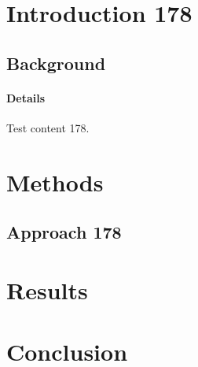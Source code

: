\documentclass{article}
\begin{document}
\section{Introduction 178}
\subsection{Background}
\paragraph{Details} Test content 178.
\section{Methods}
\subsection{Approach 178}
\section{Results}
\section{Conclusion}
\end{document}
